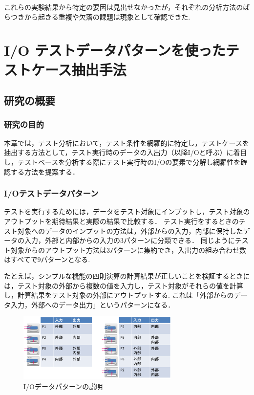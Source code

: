 \documentclass[10pt,a4j]{jarticle}
\begin{document}
これらの実験結果から特定の要因は見出せなかったが，それぞれの分析方法のばらつきから起きる重複や欠落の課題は現象として確認できた.

\section{I/O テストデータパターンを使ったテストケース抽出手法}\label{chap:4}
\subsection{研究の概要} \label{sec:4-1}
\subsubsection{研究の目的} \label{sec:4-1-1}
本章では，テスト分析において，テスト条件を網羅的に特定し，テストケースを抽出する方法として，テスト実行時のデータの入出力（以降I/Oと呼ぶ）に着目し，テストベースを分析する際にテスト実行時のI/Oの要素で分解し網羅性を確認する方法を提案する．

\subsubsection{I/Oテストデータパターン} \label{sec:4-1-1}
テストを実行するためには，データをテスト対象にインプットし，テスト対象のアウトプットを期待結果と実際の結果で比較する．
テスト実行をするときのテスト対象へのデータのインプットの方法は，外部からの入力，内部に保持したデータの入力，外部と内部からの入力の3パターンに分類できる．
同じようにテスト対象からのアウトプット方法は3パターンに集約でき，入出力の組み合わせ数はすべてで9パターンとなる.

たとえば，シンプルな機能の四則演算の計算結果が正しいことを検証するときには，テスト対象の外部から複数の値を入力し，テスト対象がそれらの値を計算し，計算結果をテスト対象の外部にアウトプットする.
これは「外部からのデータ入力，外部へのデータ出力」というパターンになる．

\begin{figure}[htbp]
 \begin{center}
 \includegraphics[width=8cm]{./image/D-3-Fig5.png}
 \caption{I/Oデータパターンの説明}
 \label{fig:D-3-Fig11}
 \end{center}
\end{figure}
\end{document}
